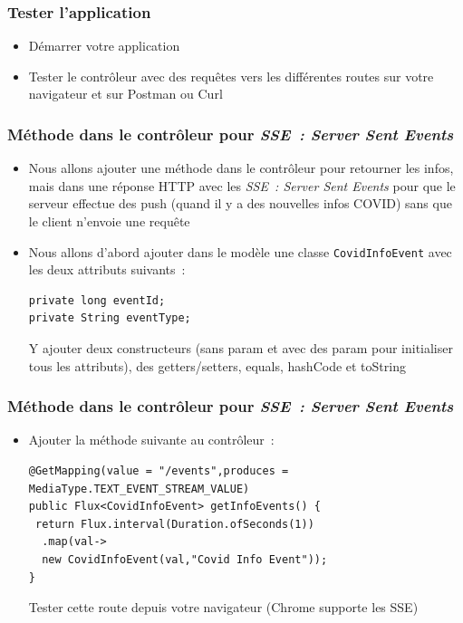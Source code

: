 \documentclass{beamer}
\begin{document}
\begin{frame}
	\frametitle{Tester l'application}
	\begin{itemize}
		\item Démarrer votre application
		\item Tester le contrôleur avec des requêtes vers les différentes routes sur votre navigateur et sur Postman ou Curl
		
	\end{itemize}
\end{frame}

\begin{frame}[fragile]
	\frametitle{Méthode dans le contrôleur pour \textit{SSE~: Server Sent Events}}
	\begin{itemize}
		\item Nous allons ajouter une méthode dans le contrôleur pour retourner les infos, mais dans une réponse HTTP avec les \textit{SSE~: Server Sent Events} pour que le serveur effectue des push (quand il y a des nouvelles infos COVID) sans que le client n'envoie une requête
		\item Nous allons d'abord ajouter dans le modèle une classe \texttt{CovidInfoEvent} avec les deux attributs suivants~:
\begin{lstlisting}
private long eventId;
private String eventType;
\end{lstlisting}
Y ajouter deux constructeurs (sans param et avec des param pour initialiser tous les attributs), des getters/setters, equals, hashCode et toString
	\end{itemize}
\end{frame}

\begin{frame}[fragile]
	\frametitle{Méthode dans le contrôleur pour \textit{SSE~: Server Sent Events}}
	\begin{itemize}
		\item Ajouter la méthode suivante au contrôleur~:
\begin{lstlisting}
@GetMapping(value = "/events",produces = MediaType.TEXT_EVENT_STREAM_VALUE)
public Flux<CovidInfoEvent> getInfoEvents() {
 return Flux.interval(Duration.ofSeconds(1))
  .map(val->
  new CovidInfoEvent(val,"Covid Info Event"));
}
\end{lstlisting}
Tester cette route depuis votre navigateur (Chrome supporte les SSE)
	\end{itemize}
\end{frame}
\end{document}
